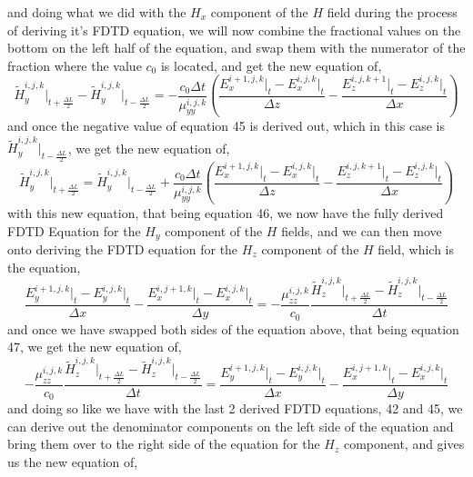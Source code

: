 \documentclass[]{article}
\begin{document}
and doing what we did with the $H_x$ component of the $H$ field during the process of deriving it's FDTD equation, we will now combine the fractional values on the bottom on the left half of the equation, and swap them with the numerator of the fraction where the value $c_0$ is located, and get the new equation of,
\begin{equation}
\tilde{H}_{y}^{i,j,k}\Big|_{t+\frac{\Delta{L}}{2}} - \tilde{H}_{y}^{i,j,k}\Big|_{t-\frac{\Delta{L}}{2}} = -\frac{c_0\Delta{t}}{\mu_{yy}^{i,j,k}} \left(\frac{E_{x}^{i+1,j,k} \Big|_t - E_{x}^{i,j,k}\Big|_t}{\Delta{z}} - \frac{E_{z}^{i,j,k+1} \Big|_t - E_{z}^{i,j,k}\Big|_t}{\Delta{x}}\right)
\end{equation}
and once the negative value of equation 45 is derived out, which in this case is $\tilde{H}_{y}^{i,j,k}\Big|_{t-\frac{\Delta{L}}{2}}$, we get the new equation of,
\begin{equation}
\tilde{H}_y^{i,j,k}\Big|_{t+\frac{\Delta{L}}{2}} = \tilde{H}_{y}^{i,j,k}\Big|_{t-\frac{\Delta{L}}{2}} + \frac{c_0\Delta{t}}{\mu_{yy}^{i,j,k}} \left(\frac{E_{x}^{i+1,j,k} \Big|_t - E_{x}^{i,j,k}\Big|_t}{\Delta{z}} - \frac{E_{z}^{i,j,k+1} \Big|_t - E_{z}^{i,j,k}\Big|_t}{\Delta{x}}\right)
\end{equation}
with this new equation, that being equation 46, we now have the fully derived FDTD Equation for the $H_y$ component of the $H$ fields, and we can then move onto deriving the FDTD equation for the $H_z$ component of the $H$ field, which is the equation,
\begin{equation}
\frac{E_{y}^{i+1, j, k} \Big|_t - E_{y}^{i,j,k}\Big|_t}{\Delta{x}} - \frac{E_{x}^{i, j+1, k} \Big|_t - E_{x}^{i,j,k}\Big|_t}{\Delta{y}} = -\frac{\mu_{zz}^{i,j,k}}{c_0} \frac{\tilde{H}_{z}^{i,j,k}\Big|_{t+\frac{\Delta{L}}{2}} - \tilde{H}_{z}^{i,j,k}\Big|_{t - \frac{\Delta{L}}{2}}}{\Delta{t}}
\end{equation}
and once we have swapped both sides of the equation above, that being equation 47, we get the new equation of,
\begin{equation}
-\frac{\mu_{zz}^{i,j,k}}{c_0} \frac{\tilde{H}_{z}^{i,j,k}\Big|_{t+\frac{\Delta{L}}{2}} - \tilde{H}_{z}^{i,j,k}\Big|_{t - \frac{\Delta{L}}{2}}}{\Delta{t}} = \frac{E_{y}^{i+1, j, k} \Big|_t - E_{y}^{i,j,k}\Big|_t}{\Delta{x}} - \frac{E_{x}^{i, j+1, k} \Big|_t - E_{x}^{i,j,k}\Big|_t}{\Delta{y}}
\end{equation}
and doing so like we have with the last 2 derived FDTD equations, 42 and 45, we can derive out the denominator components on the left side of the equation and bring them over to the right side of the equation for the $H_z$ component, and gives us the new equation of,
\end{document}
